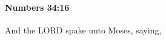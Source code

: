 
		\paragraph{Numbers 34:16} %
			\label{NUMBERS-34-16}

			And the LORD spake unto Moses, saying,


